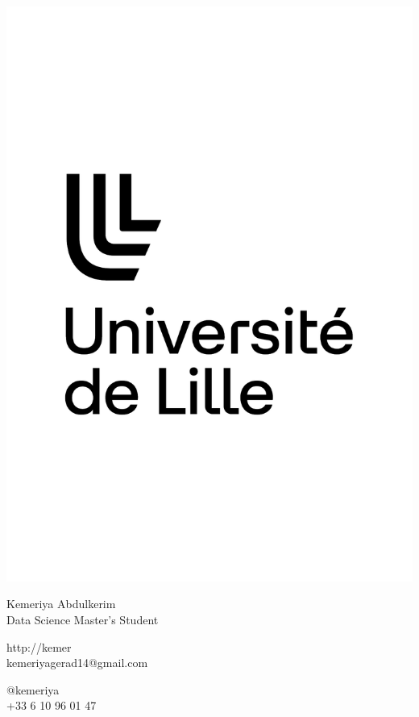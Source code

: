\documentclass{article}
\begin{document}
\centering \includegraphics[width=.25\linewidth]{logo}\\[5pt]
\parbox{2in}{\Large \centering Kemeriya Abdulkerim\\[1pt]
\normalsize Data Science Master's Student}

\vfill
\raggedright
\begin{multicols}{2}
http://kemer\\
kemeriyagerad14@gmail.com

\columnbreak
\raggedleft
@kemeriya\\
+33 6 10 96 01 47%
\end{multicols}%
\end{document}
